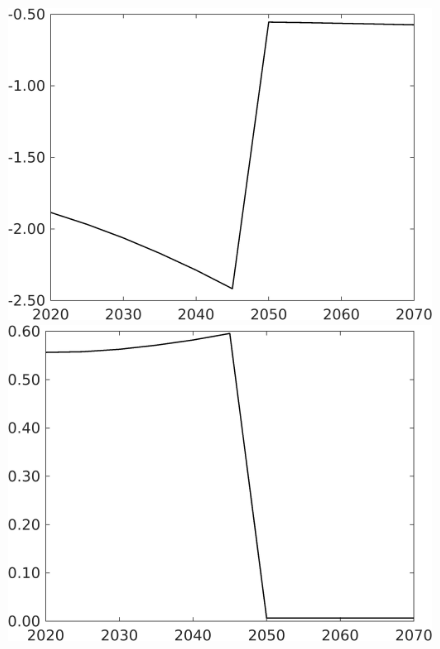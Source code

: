 \begin{figure}[h!!!]
\begin{minipage}[]{0.32\textwidth}
	\includegraphics[width=1\textwidth]{../../codding_model/own_basedOnFried/optimalPol_010922_revision/figures/all_13Sept22_Tplus30/sff_OPT_COMPtaulPer_regime4_spillover0_knspil1_noskill1_sep0_xgrowth0_PV1_etaa0.79.png}
\end{minipage}
\begin{minipage}[]{0.32\textwidth}
	\includegraphics[width=1\textwidth]{../../codding_model/own_basedOnFried/optimalPol_010922_revision/figures/all_13Sept22_Tplus30/sg_OPT_COMPtaulPer_regime4_spillover0_knspil1_noskill1_sep0_xgrowth0_PV1_etaa0.79.png}

\end{minipage}
\end{figure}
